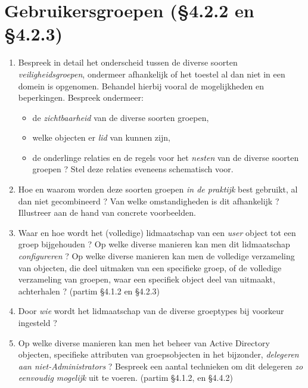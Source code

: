 \documentclass{report}
\begin{document}
	\section{Gebruikersgroepen {\color{red}(§4.2.2 en §4.2.3)}}
	\begin{enumerate}
		\item Bespreek in detail het onderscheid tussen de diverse soorten \textit{veiligheidsgroepen}, ondermeer afhankelijk of het toestel al dan niet in een domein is opgenomen. Behandel hierbij vooral de mogelijkheden en beperkingen. Bespreek ondermeer:
			\begin{itemize}
				\item de \textit{zichtbaarheid} van de diverse soorten groepen,
				\item welke objecten er \textit{lid} van kunnen zijn,
				\item de onderlinge relaties en de regels voor het \textit{nesten} van de diverse soorten groepen ? Stel deze relaties eveneens schematisch voor.
			\end{itemize}
		\item Hoe en waarom worden deze soorten groepen \textit{in de praktijk} best gebruikt, al dan niet gecombineerd ? Van welke omstandigheden is dit afhankelijk ? Illustreer aan de hand van concrete voorbeelden. 
		
		\item Waar en hoe wordt het (volledige) lidmaatschap van een \textit{user} object tot een groep bijgehouden ? Op welke diverse manieren kan men dit lidmaatschap \textit{configureren} ? Op welke diverse manieren kan men de volledige verzameling van objecten, die deel uitmaken van een specifieke groep, of de volledige verzameling van groepen, waar een specifiek object deel van uitmaakt, achterhalen ? {\color{red} (partim §4.1.2 en §4.2.3)}
		
		\item Door \textit{wie} wordt het lidmaatschap van de diverse groeptypes bij voorkeur ingesteld ?
		
		\item Op welke diverse manieren kan men het beheer van Active Directory objecten, specifieke attributen van groepsobjecten in het bijzonder, \textit{delegeren aan niet-Administrators} ? Bespreek een aantal technieken om dit delegeren \textit{zo eenvoudig mogelijk} uit te voeren. {\color{red}(partim §4.1.2, en §4.4.2)} 
	\end{enumerate}
\end{document}
